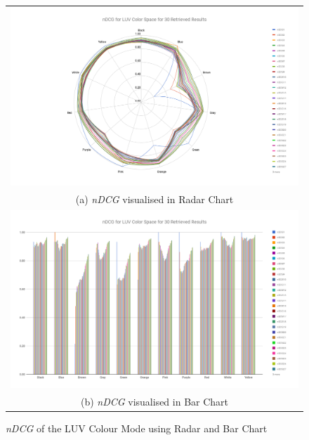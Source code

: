 \begin{figure}[htb!]
  \centering
  \begin{tabular}{c}
    \includegraphics[width=0.9\linewidth]{image/retrievalTwo/radar_ndcg_luv.png}\\
    (a) \textit{nDCG} visualised in Radar Chart \\
    \includegraphics[width=0.9\linewidth]{image/retrievalTwo/bar_ndcg_luv.png}\\
    (b) \textit{nDCG} visualised in Bar Chart \\
  \end{tabular}
  \caption{\textit{nDCG} of the LUV Colour Mode using Radar and Bar Chart}
  \label{fig:colorndcg}
\end{figure}


